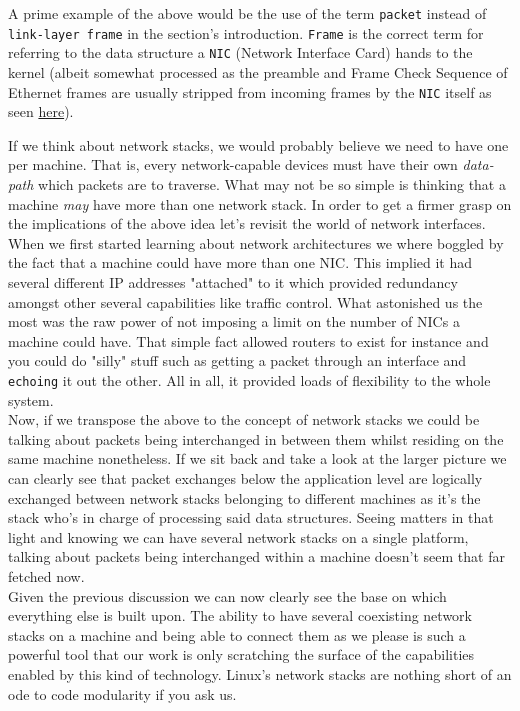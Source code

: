             A prime example of the above would be the use of the term \texttt{packet} instead of \texttt{link-layer frame} in the section's introduction. \texttt{Frame} is the correct term for referring to the data structure a \texttt{NIC} (Network Interface Card) hands to the kernel (albeit somewhat processed as the preamble and Frame Check Sequence of Ethernet frames are usually stripped from incoming frames by the \texttt{NIC} itself as seen \href{https://gitlab.com/wireshark/wireshark/-/wikis/Ethernet}{here}).

        If we think about network stacks, we would probably believe we need to have one per machine. That is, every network-capable devices must have their own \textit{data-path} which packets are to traverse. What may not be so simple is thinking that a machine \textit{may} have more than one network stack. In order to get a firmer grasp on the implications of the above idea let's revisit the world of network interfaces.\\
        
        When we first started learning about network architectures we where boggled by the fact that a machine could have more than one NIC. This implied it had several different IP addresses "attached" to it which provided redundancy amongst other several capabilities like traffic control. What astonished us the most was the raw power of not imposing a limit on the number of NICs a machine could have. That simple fact allowed routers to exist for instance and you could do "silly" stuff such as getting a packet through an interface and \texttt{echoing} it out the other. All in all, it provided loads of flexibility to the whole system.\\

        Now, if we transpose the above to the concept of network stacks we could be talking about packets being interchanged in between them whilst residing on the same machine nonetheless. If we sit back and take a look at the larger picture we can clearly see that packet exchanges below the application level are logically exchanged between network stacks belonging to different machines as it's the stack who's in charge of processing said data structures. Seeing matters in that light and knowing we can have several network stacks on a single platform, talking about packets being interchanged within a machine doesn't seem that far fetched now.\\

        Given the previous discussion we can now clearly see the base on which everything else is built upon. The ability to have several coexisting network stacks on a machine and being able to connect them as we please is such a powerful tool that our work is only scratching the surface of the capabilities enabled by this kind of technology. Linux's network stacks are nothing short of an ode to code modularity if you ask us.\\

